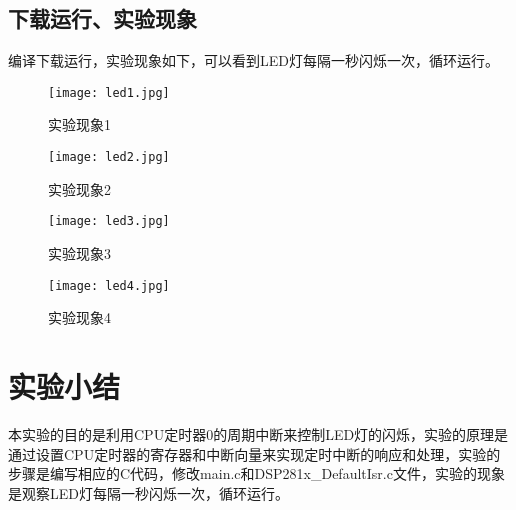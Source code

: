 \documentclass{math201}
\begin{document}
\subsection{下载运行、实验现象}

编译下载运行，实验现象如下，可以看到LED灯每隔一秒闪烁一次，循环运行。

\begin{figure}[H]  
  \centering\texttt{[image: led1.jpg]}  
  \caption{实验现象1}      
\end{figure}

\begin{figure}[H]  
  \centering\texttt{[image: led2.jpg]}  
  \caption{实验现象2}      
\end{figure}

\begin{figure}[H]  
  \centering\texttt{[image: led3.jpg]}  
  \caption{实验现象3}      
\end{figure}

\begin{figure}[H]  
  \centering\texttt{[image: led4.jpg]}  
  \caption{实验现象4}      
\end{figure}

\section{实验小结}

本实验的目的是利用CPU定时器0的周期中断来控制LED灯的闪烁，实验的原理是通过设置CPU定时器的寄存器和中断向量来实现定时中断的响应和处理，实验的步骤是编写相应的C代码，修改main.c和DSP281x\_DefaultIsr.c文件，实验的现象是观察LED灯每隔一秒闪烁一次，循环运行。
\end{document}
